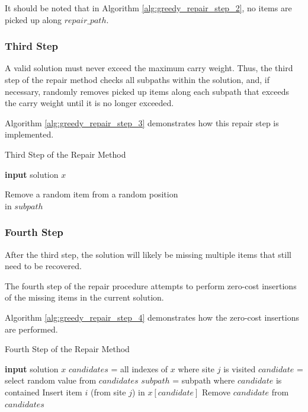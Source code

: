 \documentclass[conference]{IEEEtran}
\begin{document}
It should be noted that in Algorithm \ref{alg:greedy_repair_step_2}, no items are picked up along $repair\_path$.

\subsubsection{Third Step}

A valid solution must never exceed the maximum carry weight. Thus, the third step of the repair method checks all subpaths within the solution, and, if necessary, randomly removes picked up items along each subpath that exceeds the carry weight until it is no longer exceeded.

Algorithm \ref{alg:greedy_repair_step_3} demonstrates how this repair step is implemented.


\begin{algorithm}[h!]
\caption{Third Step of the Repair Method}
\label{alg:greedy_repair_step_3}
\begin{algorithmic}[1]
\State \textbf{input} solution $x$
\State \parbox[t]{\dimexpr\textwidth-\leftmargin-\labelsep-\labelwidth}{Remove a random item from a random position\\in $subpath$\strut}
\EndWhile
\EndFor
\end{algorithmic}
\end{algorithm}


\subsubsection{Fourth Step}

After the third step, the solution will likely be missing multiple items that still need to be recovered. 

The fourth step of the repair procedure attempts to perform zero-cost insertions of the missing items in the current solution.

Algorithm \ref{alg:greedy_repair_step_4} demonstrates how the zero-cost insertions are performed.

\begin{algorithm}[h!]
\caption{Fourth Step of the Repair Method}
\label{alg:greedy_repair_step_4}
\begin{algorithmic}[1]
\State \textbf{input} solution $x$
\State $candidates$ = all indexes of $x$ where site $j$ is visited
\State $candidate$ = select random value from $candidates$
\State $subpath$ = subpath where $candidate$ is contained
\State Insert item $i$ (from site $j$) in $x[candidate]$
\Else
\State Remove $candidate$ from $candidates$
\EndIf
\EndWhile
\EndFor
\end{algorithmic}
\end{algorithm}
\end{document}
